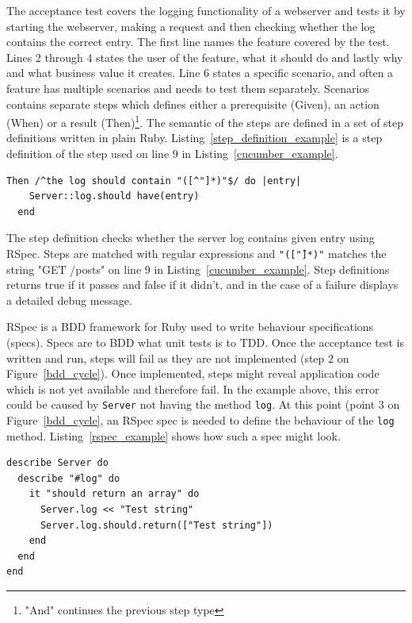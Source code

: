 The acceptance test covers the logging functionality of a webserver and tests it
by starting the webserver, making a request and then checking whether the log
contains the correct entry.  The first line names the feature covered by the
test. Lines 2 through 4 states the user of the feature, what it should do and
lastly why and what business value it creates. Line 6 states a specific
scenario, and often a feature has multiple scenarios and needs to test them
separately. Scenarios contains separate steps which defines either a
prerequisite (Given), an action (When) or a result (Then)\footnote{"And"
continues the previous step type}. The semantic of the steps are defined in a
set of step definitions written in plain Ruby.
Listing~\ref{step_definition_example} is a step definition of the step used on
line 9 in Listing~\ref{cucumber_example}.

\bigskip
\begin{lstlisting}[label=step_definition_example,caption=Cucumber step definition]
  Then /^the log should contain "([^"]*)"$/ do |entry|
    Server::log.should have(entry)
  end
\end{lstlisting}

The step definition checks whether the server log contains given entry using
RSpec. Steps are matched with regular expressions and \texttt{"([\^"]*)"}
matches the string "GET /posts" on line 9 in Listing~\ref{cucumber_example}.
Step definitions returns true if it passes and false if it didn't, and in the
case of a failure displays a detailed debug message.

RSpec is a BDD framework for Ruby used to write behaviour specifications
(specs). Specs are to BDD what unit tests is to TDD. Once the acceptance test is
written and run, steps will fail as they are not implemented (step 2 on
Figure~\ref{bdd_cycle}). Once implemented, steps might reveal application code
which is not yet available and therefore fail. In the example above, this error
could be caused by \texttt{Server} not having the method \texttt{log}. At this
point (point 3 on Figure~\ref{bdd_cycle}, an RSpec spec is needed to define the
behaviour of the \texttt{log} method. Listing~\ref{rspec_example} shows how such
a spec might look.

\bigskip
\begin{lstlisting}[label=rspec_example,caption=RSpec (spec) example]
describe Server do
  describe "#log" do
    it "should return an array" do
      Server.log << "Test string"
      Server.log.should.return(["Test string"])
    end
  end
end
\end{lstlisting}


